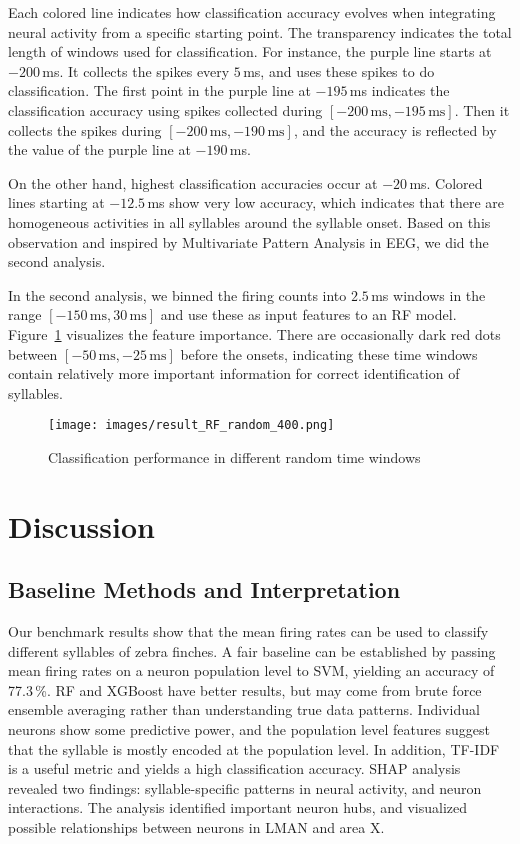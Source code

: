 \documentclass[../CLthesis.tex]{subfiles}
\begin{document}
Each colored line indicates how classification accuracy evolves when integrating neural activity from a specific starting point. The transparency indicates the total length of windows used for classification. For instance, the purple line starts at $-200$\,ms. It collects the spikes every $5$\,ms, and uses these spikes to do classification. The first point in the purple line at $-195$\,ms indicates the classification accuracy using spikes collected during $[-200\,\text{ms}, -195\,\text{ms}]$. Then it collects the spikes during $[-200\,\text{ms}, -190\,\text{ms}]$, and the accuracy is reflected by the value of the purple line at $-190$\,ms.

On the other hand, highest classification accuracies occur at $-20$\,ms. Colored lines starting at $-12.5$\,ms show very low accuracy, which indicates that there are homogeneous activities in all syllables around the syllable onset. Based on this observation and inspired by Multivariate Pattern Analysis in EEG, we did the second analysis. 

In the second analysis, we binned the firing counts into $2.5$\,ms windows in the range $[-150\,\text{ms}, 30\,\text{ms}]$ and use these as input features to an RF model. Figure~\ref{fig:random_windows} visualizes the feature importance. There are occasionally dark red dots between $[-50\,\text{ms}, -25\,\text{ms}]$ before the onsets, indicating these time windows contain relatively more important information for correct identification of syllables.

\begin{figure}[H]
 \centering
 \texttt{[image: images/result\_RF\_random\_400.png]}
 \caption{Classification performance in different random time windows}
 \label{fig:random_windows}
\end{figure}

\newpage
\section{Discussion}
\subsection{Baseline Methods and Interpretation}
Our benchmark results show that the mean firing rates can be used to classify different syllables of zebra finches. A fair baseline can be established by passing mean firing rates on a neuron population level to SVM, yielding an accuracy of 77.3\,\%. RF and XGBoost have better results, but may come from brute force ensemble averaging rather than understanding true data patterns. Individual neurons show some predictive power, and the population level features suggest that the syllable is mostly encoded at the population level. In addition, TF-IDF is a useful metric and yields a high classification accuracy. SHAP analysis revealed two findings: syllable-specific patterns in neural activity, and neuron interactions. The analysis identified important neuron hubs, and visualized possible relationships between neurons in LMAN and area X. 
\end{document}

